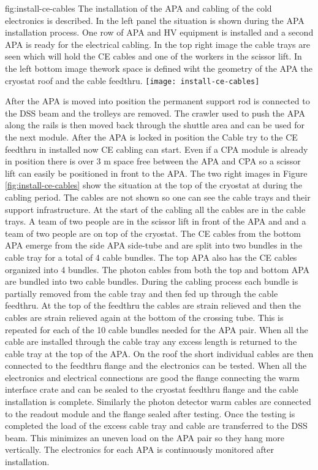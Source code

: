 \begin{dunefigure}{fig:install-ce-cables}
  {The installation of the APA and cabling of the cold electronics is described. In the left panel the situation is shown during the APA installation process. One row of APA and HV equipment is installed and a second APA is ready for the electrical cabling. In the top right image the cable trays are seen which will hold the CE cables and one of the workers in the scissor lift. In the left bottom image thework space is defined wiht the geometry of the APA the cryostat roof and the cable feedthru.}
\texttt{[image: install-ce-cables]}
\end{dunefigure}

After the APA is moved into position the permanent support rod is connected to the DSS beam and the trolleys are removed. 
The crawler used to push the APA along the rails is then moved back through the shuttle area and can be used for the next module. 
After the APA is locked in position the Cable try to the CE feedthru in installed now CE cabling can start. 
Even if a CPA module is already in position there is over 3 \si{m} space free between the APA and CPA so a scissor lift can easily be positioned in front to the APA. 
The two right images in Figure \ref{fig:install-ce-cables} show the situation at the top of the cryostat at during the cabling period. 
The cables are not shown so one can see the cable trays and their support infrastructure. 
At the start of the cabling all the cables are in the cable trays. 
A team of two people are in the scissor lift in front of the APA and  and a team of two people are on top of the cryostat. 
The CE cables from the bottom APA emerge from the side APA side-tube and are split into two bundles in the cable tray for a total of 4 cable bundles. 
The top APA also has the CE cables organized into 4 bundles. 
The photon cables from both the top and bottom APA are bundled into two cable bundles.
During the cabling process each bundle is partially removed from the cable tray and then fed up through the cable feedthru. 
At the top of the feedthru the cables are strain relieved and then the cables are strain relieved again at the bottom of the crossing tube.
This is repeated for each of the 10 cable bundles needed for the APA pair. 
When all the cable are installed through the cable tray any excess length is returned to the cable tray at the top of the APA. 
On the roof the short individual cables are then connected to the feedthru flange and the electronics can be tested. 
When all the electronics and electrical connections are good the flange connecting the warm interface crate and can be sealed to the cryostat feedthru flange and the cable installation is complete. Similarly the photon detector warm cables are connected to the readout module and the flange sealed after testing.  Once the testing is completed the load of the excess cable tray and cable are transferred to the DSS beam.  This minimizes an uneven load on the APA pair so they hang more vertically.   
The electronics for each APA is continuously monitored after installation. 

